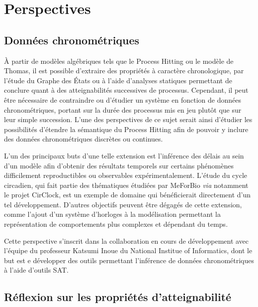 \chapter{Perspectives}

\section{Données chronométriques}
À partir de modèles algébriques tels que le Process Hitting ou le modèle de Thomas, il est possible d'extraire des propriétés à caractère chronologique,
par l'étude du Graphe des États ou à l'aide d'analyses statiques permettant de conclure quant à des atteignabilités successives de processus.
Cependant, il peut être nécessaire de contraindre ou d'étudier un système en fonction de données chronométriques, portant sur la durée des processus mis en jeu plutôt que sur leur simple succession.
L'une des perspectives de ce sujet serait ainsi d'étudier les possibilités d'étendre la sémantique du Process Hitting afin de pouvoir y inclure des données chronométriques discrètes ou continues.

L'un des principaux buts d'une telle extension est l'inférence des délais au sein d'un modèle afin d'obtenir des résultats temporels sur certains phénomènes difficilement reproductibles ou observables expérimentalement.
L'étude du cycle circadien, qui fait partie des thématiques étudiées par MeForBio \textit{via} notamment le projet CirClock, est un exemple de domaine qui bénéficierait directement d'un tel développement.
D'autres objectifs peuvent être dégagés de cette extension, comme l'ajout d'un système d'horloges à la modélisation permettant la représentation de comportements plus complexes et dépendant du temps.

Cette perspective s'inscrit dans la collaboration en cours de développement avec l'équipe du professeur Katsumi Inoue du National Institue of Informatics,
dont le but est e développer des outils permettant l'inférence de données chronométriques à l'aide d'outils SAT.




\section{Réflexion sur les propriétés d'atteignabilité}

